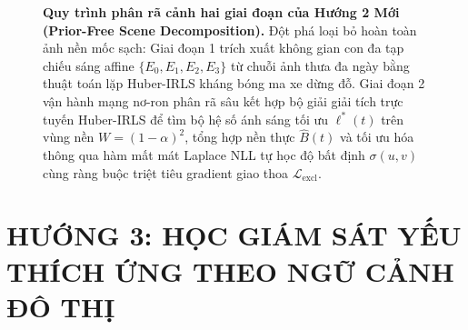 \documentclass[11pt,a4paper]{article}
\begin{document}
\begin{figure}[t!]
\caption{\textbf{Quy trình phân rã cảnh hai giai đoạn của Hướng 2 Mới (Prior-Free Scene Decomposition).} Đột phá loại bỏ hoàn toàn ảnh nền mốc sạch: Giai đoạn 1 trích xuất không gian con đa tạp chiếu sáng affine $\{E_0, E_1, E_2, E_3\}$ từ chuỗi ảnh thưa đa ngày bằng thuật toán lặp Huber-IRLS kháng bóng ma xe dừng đỗ. Giai đoạn 2 vận hành mạng nơ-ron phân rã sâu kết hợp bộ giải giải tích trực tuyến Huber-IRLS để tìm bộ hệ số ánh sáng tối ưu $\bm{\ell}^*(t)$ trên vùng nền $W=(1-\alpha)^2$, tổng hợp nền thực $\hat{B}(t)$ và tối ưu hóa thông qua hàm mất mát Laplace NLL tự học độ bất định $\sigma(u, v)$ cùng ràng buộc triệt tiêu gradient giao thoa $\mathcal{L}_{\text{excl}}$.}
\label{fig:pipeline_direction2_new}
\end{figure}

\section{HƯỚNG 3: HỌC GIÁM SÁT YẾU THÍCH ỨNG THEO NGỮ CẢNH ĐÔ THỊ}
\end{document}
